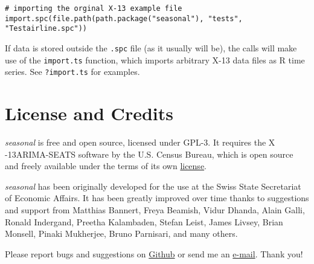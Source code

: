 \begin{verbatim}
# importing the orginal X-13 example file
import.spc(file.path(path.package("seasonal"), "tests", "Testairline.spc"))
\end{verbatim}

If data is stored outside the \texttt{.spc} file (as it usually will
be), the calls will make use of the \texttt{import.ts} function, which
imports arbitrary X-13 data files as R time series. See
\texttt{?import.ts} for examples.

\section{License and Credits}\label{license-and-credits}

\emph{seasonal} is free and open source, licensed under GPL-3. It
requires the X -13ARIMA-SEATS software by the U.S. Census Bureau, which
is open source and freely available under the terms of its own
\href{https://www.census.gov/srd/www/disclaimer.html}{license}.

\emph{seasonal} has been originally developed for the use at the Swiss
State Secretariat of Economic Affairs. It has been greatly improved over
time thanks to suggestions and support from Matthias Bannert, Freya
Beamish, Vidur Dhanda, Alain Galli, Ronald Indergand, Preetha
Kalambaden, Stefan Leist, James Livsey, Brian Monsell, Pinaki Mukherjee,
Bruno Parnisari, and many others.

Please report bugs and suggestions on
\href{https://github.com/christophsax/seasonal}{Github} or send me an
\href{mailto:christoph.sax@gmail.com}{e-mail}. Thank you!
